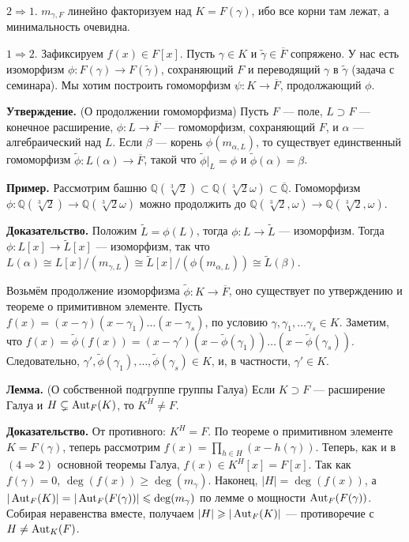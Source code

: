 $2 \Rightarrow 1$. $m_{\gamma, F}$ линейно факторизуем над $K = F(\gamma)$, ибо все корни там лежат, а минимальность очевидна.

$1 \Rightarrow 2$. Зафиксируем $f(x) \in F[x]$.
Пусть $\gamma \in K$ и $\tilde{\gamma} \in \overline F$ сопряжено.
У нас есть изоморфизм $\phi: F(\gamma) \to F(\tilde \gamma)$, сохраняющий $F$ и переводящий $\gamma$ в $\tilde \gamma$ (задача с семинара).
Мы хотим построить гомоморфизм $\psi: K \to \overline F$, продолжающий $\phi$.

\textbf{Утверждение.} (О продолжении гомоморфизма) Пусть $F$ --- поле, $L \supset F$ --- конечное расширение, $\phi: L \to \overline F$ --- гомоморфизм, сохраняющий $F$, и $\alpha$ --- алгебраический над $L$.
Если $\beta$ --- корень $\phi(m_{\alpha, L})$, то существует единственный гомоморфизм $\tilde \phi: L(\alpha) \to \overline F$, такой что $\tilde \phi|_L = \phi$ и $\tilde \phi(\alpha) = \beta$.

\textbf{Пример.} Рассмотрим башню $\mathbb Q(\sqrt[3]{2}) \subset \mathbb Q(\sqrt[3]{2} \omega) \subset \overline {\mathbb Q}$.
Гомоморфизм $\phi: \mathbb Q(\sqrt[3]{2}) \to \mathbb Q(\sqrt[3]{2} \omega)$ можно продолжить до $\mathbb Q(\sqrt[3]{2}, \omega) \to \mathbb Q(\sqrt[3]{2}, \omega)$.

\textbf{Доказательство.} Положим $\tilde L = \phi(L)$, тогда $\phi: L \to \tilde L$ --- изоморфизм.
Тогда $\phi: L[x] \to \tilde L[x]$ --- изоморфизм, так что $L(\alpha) \cong L[x] / (m_{\gamma, L}) \cong \tilde L[x] / (\phi(m_{\alpha, L})) \cong \tilde L(\beta)$.

\QED

Возьмём продолжение изоморфизма $\tilde \phi: K \to \overline F$, оно существует по утверждению и теореме о примитивном элементе.
Пусть $f(x) = (x - \gamma)(x - \gamma_1) \dots (x - \gamma_s)$, по условию $\gamma, \gamma_1, \dots \gamma_s \in K$.
Заметим, что $f(x) = \tilde \phi(f(x)) = (x - \gamma')(x - \tilde \phi(\gamma_1)) \dots (x - \tilde \phi(\gamma_s))$.
Следовательно, $\gamma', \tilde \phi(\gamma_1), \dots, \tilde \phi(\gamma_s) \in K$, и, в частности, $\gamma' \in K$.

\QED

\textbf{Лемма.} (О собственной подгруппе группы Галуа) Если $K \supset F$ --- расширение Галуа и $H \subsetneq \operatorname{Aut}_F(K)$, то $K^H \ne F$.

\textbf{Доказательство.} От противного: $K^H = F$. По теореме о примитивном элементе $K = F(\gamma)$, теперь рассмотрим $f(x) = \prod_{h \in H}(x - h(\gamma))$.
Теперь, как и в $(4 \Rightarrow 2)$ основной теоремы Галуа, $f(x) \in K^H[x] = F[x]$.
Так как $f(\gamma) = 0$, $\deg(f(x)) \ge \deg(m_\gamma)$.
Наконец, $|H| = \deg(f(x))$, а $|\operatorname{Aut}_F(K)| = |\operatorname{Aut}_F(F(\gamma))| \leqslant \deg(m_\gamma)$ по лемме о мощности $\operatorname{Aut}_F(F(\gamma))$.
Собирая неравенства вместе, получаем $|H| \geqslant |\operatorname{Aut}_F(K)|$ --- противоречие с $H \ne \operatorname{Aut}_K(F)$.

